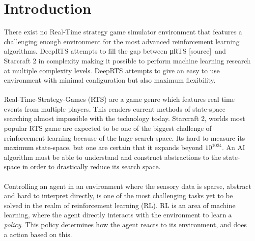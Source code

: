 \documentclass[fleqn,10pt]{SelfArx} %
\affiliation{\textsuperscript{1}\textit{Department of Information and Communication Technology, University of Agder, Grimstad, Norway}} %
\begin{document}
\flushbottom %

\maketitle %

\tableofcontents %

\thispagestyle{empty} %


\section{Introduction} %
There exist no Real-Time strategy game simulator environment that features a challenging enough environment for the most advanced reinforcement learning algorithms. DeepRTS attempts to fill the gap between μRTS [source] and Starcraft 2 in complexity making it possible to perform machine learning research at multiple complexity levels. DeepRTS attempts to give an easy to use environment with minimal configuration but also maximum flexibility.
\\
\\
Real-Time-Strategy-Games (RTS) are a game genre which features real time events from multiple players. This renders current methods of state-space searching almost impossible with the technology today. Starcraft 2, worlds most popular RTS game are expected to be one of the biggest challenge of reinforcement learning because of the huge search-space. Its hard to measure its maximum state-space, but one are certain that it expands beyond $10^{1024}$. An AI algorithm must be able to understand and construct abstractions to the state-space in order to drastically reduce its search space.
\\
\\
Controlling an agent in an environment where the sensory data is sparse, abstract and hard to interpret directly, is one of the most challenging tasks yet to be solved in the realm of reinforcement learning (RL). RL is an area of machine learning, where the agent directly interacts  with the environment to learn a \textit{policy}. This policy determines how the agent reacts to its environment, and does a action based on this.
\end{document}
